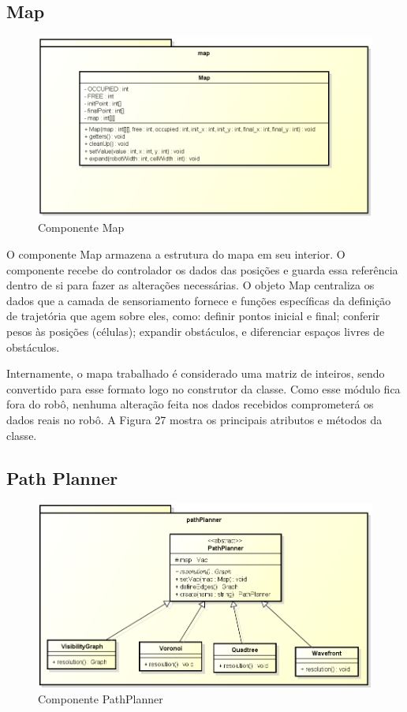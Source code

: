 \subsection{Map}

\begin{figure}[h]
	\centering
	\label{fig27}
		\includegraphics[keepaspectratio=true,scale=0.5]{figuras/pkgmap.png}
	\caption{Componente Map}
\end{figure}

O componente Map armazena a estrutura do mapa em seu interior. O componente recebe do controlador os dados das posições e guarda essa referência dentro de si para fazer as alterações necessárias. O objeto Map centraliza os dados que a camada de sensoriamento fornece e funções específicas da definição de trajetória que agem sobre eles, como: definir pontos inicial e final; conferir pesos às posições (células); expandir obstáculos, e diferenciar espaços livres de obstáculos.

Internamente, o mapa trabalhado é considerado uma matriz de inteiros, sendo convertido para esse formato logo no construtor da classe. Como esse módulo fica fora do robô, nenhuma alteração feita nos dados recebidos comprometerá os dados reais no robô. A Figura 27 mostra os principais atributos e métodos da classe.

\subsection{Path Planner}

\begin{figure}[h]
	\centering
	\label{fig28}
		\includegraphics[keepaspectratio=true,scale=0.5]{figuras/pkgpathplanner.png}
	\caption{Componente PathPlanner}
\end{figure}


